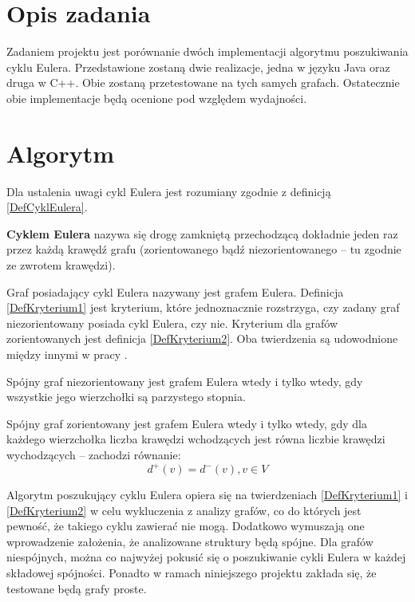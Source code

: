 \section{Opis zadania}

Zadaniem projektu jest porównanie dwóch implementacji algorytmu poszukiwania cyklu Eulera. 
Przedstawione zostaną dwie realizacje, jedna w języku Java oraz druga w C++. 
Obie zostaną przetestowane na tych samych grafach. 
Ostatecznie obie implementacje będą ocenione pod względem wydajności.

\section{Algorytm}

Dla ustalenia uwagi cykl Eulera jest rozumiany zgodnie z  definicją \ref{DefCyklEulera}.

\begin{df}
\label{DefCyklEulera}
\textbf{Cyklem Eulera} nazywa się drogę zamkniętą przechodzącą dokładnie jeden raz przez każdą krawędź grafu (zorientowanego bądź niezorientowanego -- tu zgodnie ze zwrotem krawędzi).
\end{df}

Graf posiadający cykl Eulera nazywany jest grafem Eulera. Definicja \ref{DefKryterium1} jest kryterium, które jednoznacznie rozstrzyga, czy zadany graf niezorientowany posiada cykl Eulera, czy nie. Kryterium dla grafów zorientowanych jest definicja \ref{DefKryterium2}. Oba twierdzenia są udowodnione między innymi w pracy  \cite{Wojciechowski}.

\begin{df}
\label{DefKryterium1}
Spójny graf niezorientowany jest grafem Eulera wtedy i tylko wtedy, gdy wszystkie jego wierzchołki są parzystego stopnia.
\end{df}

\begin{df}
\label{DefKryterium2}
Spójny graf zorientowany jest grafem Eulera wtedy i tylko wtedy, gdy dla każdego wierzchołka liczba krawędzi wchodzących jest równa liczbie krawędzi wychodzących -- zachodzi równanie:
\[d^{+}(v) = d^{-}(v), v \in V \]
\end{df}

Algorytm poszukujący cyklu Eulera opiera się na twierdzeniach \ref{DefKryterium1} i \ref{DefKryterium2} w celu wykluczenia z analizy grafów, co do których jest pewność, że takiego cyklu zawierać nie mogą.
Dodatkowo wymuszają one wprowadzenie założenia, że analizowane struktury będą spójne.
Dla grafów niespójnych, można co najwyżej pokusić się o poszukiwanie cykli Eulera w każdej składowej spójności.
Ponadto w ramach niniejszego projektu zakłada się, że testowane będą grafy proste.

